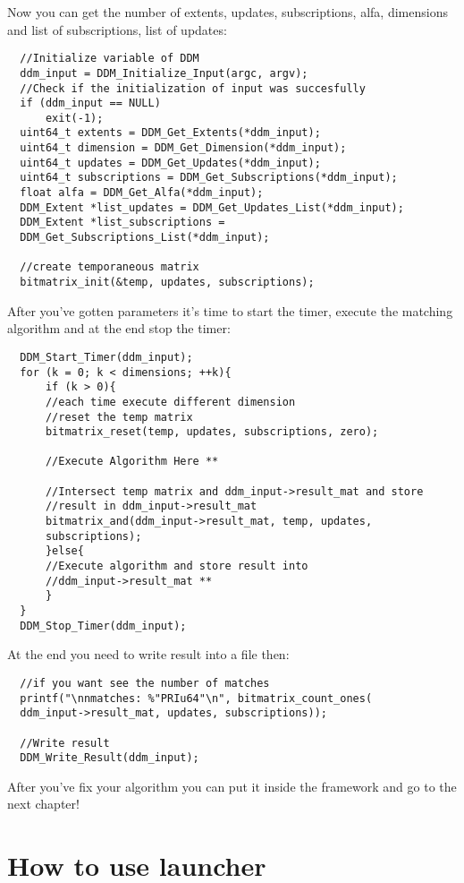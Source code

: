 \documentclass[a4paper,11pt]{report}
\begin{document}
 Now you can get the number of extents, updates, subscriptions, alfa, dimensions and list of subscriptions,
 list of updates:
 \begin{lstlisting}
  //Initialize variable of DDM
  ddm_input = DDM_Initialize_Input(argc, argv);
  //Check if the initialization of input was succesfully
  if (ddm_input == NULL)
      exit(-1);
  uint64_t extents = DDM_Get_Extents(*ddm_input);
  uint64_t dimension = DDM_Get_Dimension(*ddm_input);
  uint64_t updates = DDM_Get_Updates(*ddm_input);
  uint64_t subscriptions = DDM_Get_Subscriptions(*ddm_input);
  float alfa = DDM_Get_Alfa(*ddm_input);
  DDM_Extent *list_updates = DDM_Get_Updates_List(*ddm_input);
  DDM_Extent *list_subscriptions = 
  DDM_Get_Subscriptions_List(*ddm_input);
  
  //create temporaneous matrix
  bitmatrix_init(&temp, updates, subscriptions);
 \end{lstlisting}

 After you've gotten parameters it's time to start the timer, execute the matching algorithm and
 at the end stop the timer:
 \begin{lstlisting}
  DDM_Start_Timer(ddm_input);
  for (k = 0; k < dimensions; ++k){
      if (k > 0){
	  //each time execute different dimension
	  //reset the temp matrix
	  bitmatrix_reset(temp, updates, subscriptions, zero);

	  //Execute Algorithm Here **

	  //Intersect temp matrix and ddm_input->result_mat and store 
	  //result in ddm_input->result_mat
	  bitmatrix_and(ddm_input->result_mat, temp, updates, 
	  subscriptions);
      }else{
	  //Execute algorithm and store result into 
	  //ddm_input->result_mat **
      }
  }
  DDM_Stop_Timer(ddm_input);
 \end{lstlisting}

  At the end you need to write result into a file then:
  \begin{lstlisting}
  //if you want see the number of matches
  printf("\nnmatches: %"PRIu64"\n", bitmatrix_count_ones(
  ddm_input->result_mat, updates, subscriptions));

  //Write result
  DDM_Write_Result(ddm_input);
  \end{lstlisting}
  
  After you've fix your algorithm you can put it inside the framework and go to the next chapter!
 
 \chapter{How to use launcher}
 
\end{document}
